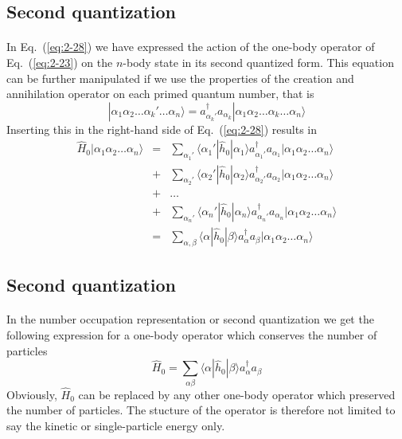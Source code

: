 \documentclass[%
twoside,                 %
final,                   %
10pt]{article}
\begin{document}
\subsection*{Second quantization}

\paragraph{}
In Eq.~(\ref{eq:2-28}) 
we have expressed the action of the one-body operator
of Eq.~(\ref{eq:2-23}) on the  $n$-body state in its second quantized form.
This equation can be further manipulated if we use the properties of the creation and annihilation operator
on each primed quantum number, that is
\begin{equation}
	|\alpha_1\alpha_2 \dots \alpha_k' \dots \alpha_{n}\rangle = 
		a_{\alpha_k'}^{\dagger}  a_{\alpha_k} |\alpha_1\alpha_2 \dots \alpha_k \dots \alpha_{n}\rangle \label{eq:2-29}
\end{equation}
Inserting this in the right-hand side of Eq.~(\ref{eq:2-28}) results in
\begin{eqnarray}
	\hat{H}_0|\alpha_1\alpha_2 \dots \alpha_{n}\rangle &=& \sum_{\alpha_1'}\langle \alpha_1'|\hat{h}_0|\alpha_1\rangle
		a_{\alpha_1'}^{\dagger}  a_{\alpha_1} |\alpha_1\alpha_2 \dots \alpha_{n}\rangle \nonumber \\
	&+& \sum_{\alpha_2'} \langle \alpha_2'|\hat{h}_0|\alpha_2\rangle
		a_{\alpha_2'}^{\dagger}  a_{\alpha_2} |\alpha_1\alpha_2 \dots \alpha_{n}\rangle \nonumber \\
	&+& \dots \nonumber \\
	&+& \sum_{\alpha_n'} \langle \alpha_n'|\hat{h}_0|\alpha_n\rangle
		a_{\alpha_n'}^{\dagger}  a_{\alpha_n} |\alpha_1\alpha_2 \dots \alpha_{n}\rangle \nonumber \\
	&=& \sum_{\alpha, \beta} \langle \alpha|\hat{h}_0|\beta\rangle a_\alpha^{\dagger} a_\beta 
		|\alpha_1\alpha_2 \dots \alpha_{n}\rangle \label{eq:2-30a}
\end{eqnarray}




\subsection*{Second quantization}

\paragraph{}
In the number occupation representation or second quantization we get the following expression for a one-body 
operator which conserves the number of particles
\begin{equation}
	\hat{H}_0 = \sum_{\alpha\beta} \langle \alpha|\hat{h}_0|\beta\rangle a_\alpha^{\dagger} a_\beta \label{eq:2-30b}
\end{equation}
Obviously, $\hat{H}_0$ can be replaced by any other one-body  operator which preserved the number
of particles. The stucture of the operator is therefore not limited to say the kinetic or single-particle energy only.
\end{document}
